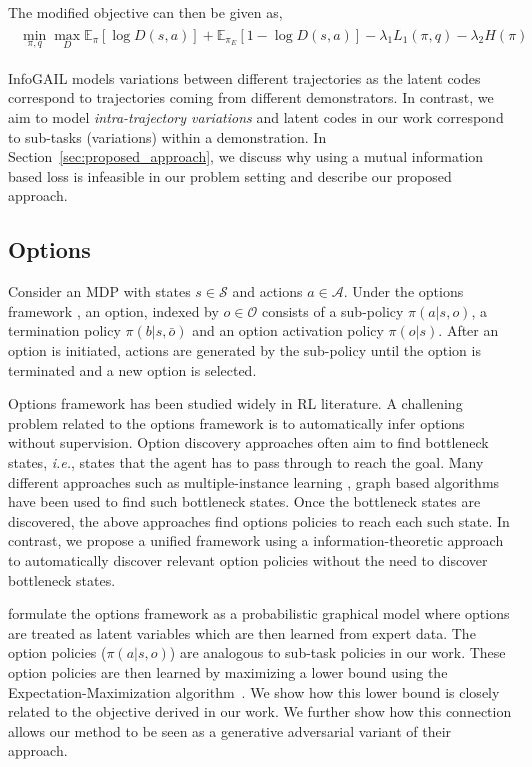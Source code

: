 \documentclass{article} %
\begin{document}
The modified objective can then be given as,
\begin{align*}
\begin{split}
    \min_{\pi, q} \max_{D} \mathbb{E}_{\pi} [\log D(s,a)] + \mathbb{E}_{\pi_E} [1-\log D(s,a)]
    -\lambda_{1}L_{1}(\pi, q) -\lambda_{2}H(\pi)
\end{split}
\end{align*}

InfoGAIL models variations between different trajectories as the latent codes correspond to trajectories coming from different demonstrators. In contrast, we aim to model \emph{intra-trajectory variations} and latent codes in our work correspond to sub-tasks (variations) within a demonstration. In Section~\ref{sec:proposed_approach}, we discuss why using a mutual information based loss is infeasible in our problem setting and describe our proposed approach.

\subsection{Options}
Consider an MDP with states $s \in \mathcal{S}$ and actions $a \in \mathcal{A}$. Under the options framework \citep{sutton1998intra}, an option, indexed by $o \in \mathcal{O}$ consists of a sub-policy $\pi(a|s,o)$, a termination policy $\pi(b|s,\bar{o})$ and an option activation policy $\pi(o|s)$. After an option is initiated, actions are generated by the sub-policy until the option is terminated and a new option is selected. 

Options framework has been studied widely in RL literature. A challening problem related to the options framework is to automatically infer options without supervision.
Option discovery approaches often aim to find bottleneck states, \emph{i.e.}, states that the agent has to pass through to reach the goal. Many different approaches such as multiple-instance learning \citep{mcgovern2001accelerating}, graph based algorithms \citep{menache2002q, csimcsek2005identifying} have  been used to find such bottleneck states. Once the bottleneck states are discovered, the above approaches find options policies to reach each such state. In contrast, we propose a unified framework using a information-theoretic approach to automatically discover relevant option policies without the need to discover bottleneck states.

\cite{daniel2016probabilistic} formulate the options framework as a probabilistic graphical model where options are treated as latent variables which are then learned from expert data. The option policies ($\pi(a|s,o)$) are analogous to sub-task policies in our work. These option policies are then learned by maximizing a lower bound using the Expectation-Maximization algorithm~\citep{moon1996expectation}. We show how this lower bound is closely related to the objective derived in our work. We further show how this connection allows our method to be seen as a generative adversarial variant of their approach.
\end{document}
